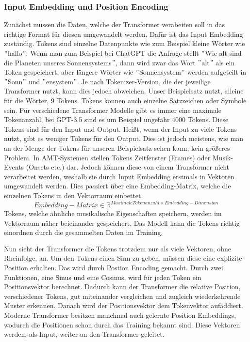 \subsubsection{Input Embedding und Position Encoding}
Zunächst müssen die Daten, welche der Transformer verabeiten soll in das richtige Format für diesen umgewandelt werden.
Dafür ist das Input Embedding zuständig.
Tokens sind einzelne Datenpunkte wie zum Beispiel kleine Wörter wie \("\)hallo\("\).
Wenn man zum Beispiel bei ChatGPT die Anfrage stellt \("\)Wie alt sind die Planeten unseres Sonnensystems\("\),
dann wird zwar das Wort \("\)alt\("\) als ein Token gespeichert, aber längere Wörter wie \("\)Sonnensystem\("\)
werden aufgeteilt in \("\)Sonn\("\) und \("\)ensystem\("\).
Je nach Tokenizer-Version, die der jeweilige Transformer nutzt, kann dies jedoch abweichen.
Unser Beispielsatz nutzt, alleine für die Wörter, 9 Tokens.
Tokens können auch einzelne Satzzeichen oder Symbole sein.
Für verschiedene Transformer Modelle gibt es immer eine maximale Tokenanzahl,
bei GPT-3.5 sind es um Beispiel ungefähr 4000 Tokens.
Diese Tokens sind für den Input und Output.
Heißt, wenn der Input zu viele Tokens nutzt, gibt es weniger Tokens für den Output.
Dies ist jedoch meistens, wie man an der Menge der Tokens für unseren Beispielsatz sehen kann, kein größeres Problem.
In AMT-Systemen stellen Tokens Zeitfenster (Frames) oder Musik-Events (Onsets etc.) dar.
Jedoch können diese von einem Transformer nicht verarbeitet werden,
weshalb sie durch Input Embedding erstmals in Vektoren  umgewandelt werden.
Dies passiert über eine Embedding-Matrix, welche die einzelnen Tokens in den Vektorraum einbettet.
\[
Embedding-Matrix \in \mathbb{R}^{Maximale Tokenanzahl \times Embedding-Dimension}
\]
Tokens, welche ähnliche musikalische Eigenschaften speichern, werden im Vektorraum näher beieinander gespeichert.
Das Modell kann die Tokens richtig einordnen durch die gesammelten Daten im Training.

Nun sieht der Transformer die Tokens trotzdem nur als viele Vektoren, ohne Rheinfolge, an.
Um den Tokens einen Sinn zu geben, müssen diese eine explizite Position erhalten.
Das wird durch Postion Encoding gemacht.
Durch zwei Funktionen, eine Sinus und eine Cosinus, wird für jeden Token ein Positionsvektor berechnet.
Dadurch kann der Transformer die relative Position, verschiedener Tokens,
gut miteinander vergleichen und zugleich wiederkehrende Muster erkennen.
Danach wird der Positionsvektor dem Tokenvektor aufaddiert.
Moderne Transformer besitzen manchmal auch gelernte Position Embeddings,
wodurch die Positionen schon durch das Training bekannt sind.
Diese Vektoren werden, als Input, weiter an den Transformer geleitet.


